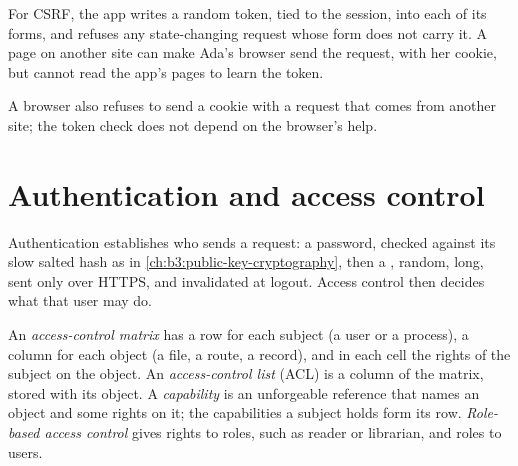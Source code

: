 For CSRF, the app writes a random token, tied to the session, into each of its forms, and refuses any state-changing request whose form does not carry it. A page on another site can make Ada's browser send the request, with her cookie, but cannot read the app's pages to learn the token.

\label{out:b3:software-security:csrf}

A browser also refuses to send a  cookie with a request that comes from another site; the token check does not depend on the browser's help.

\section{Authentication and access control}\label{sec:b3:software-security:access}

Authentication establishes who sends a request: a password, checked against its slow salted hash as in \cref{ch:b3:public-key-cryptography}, then a , random, long, sent only over HTTPS, and invalidated at logout. Access control then decides what that user may do.

\begin{definition}\label{def:b3:software-security:access}
An \emph{access-control matrix} has a row for each subject (a user or a process), a column for each object (a file, a route, a record), and in each cell the rights of the subject on the object. An \emph{access-control list} (ACL) is a column of the matrix, stored with its object. A \emph{capability} is an unforgeable reference that names an object and some rights on it; the capabilities a subject holds form its row. \emph{Role-based access control} gives rights to roles, such as reader or librarian, and roles to users.
\end{definition}

